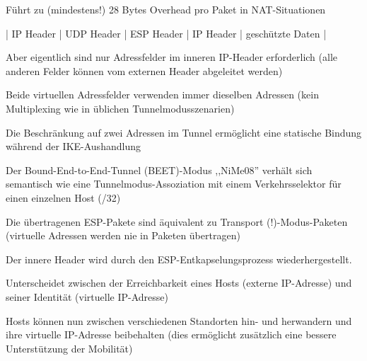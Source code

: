 \documentclass[a4paper]{article}
\begin{document}
\begin{multicols}{3}
\begin{itemize*}
\begin{itemize*}
\begin{itemize*}
                        \item Führt zu (mindestens!) 28 Bytes Overhead pro Paket in NAT-Situationen
                        \item | IP Header | UDP Header | ESP Header | IP Header | geschützte Daten |
                  \end{itemize*}
                  \item Aber eigentlich sind nur Adressfelder im inneren IP-Header
                  erforderlich (alle anderen Felder können vom externen Header
                  abgeleitet werden)
                  \item Beide virtuellen Adressfelder verwenden immer dieselben Adressen (kein
                  Multiplexing wie in üblichen Tunnelmodusszenarien)
                  \item Die Beschränkung auf zwei Adressen im Tunnel ermöglicht eine statische
                  Bindung während der IKE-Aushandlung
                  \item Der Bound-End-to-End-Tunnel (BEET)-Modus ,,NiMe08'' verhält sich
                  semantisch wie eine Tunnelmodus-Assoziation mit einem Verkehrsselektor
                  für einen einzelnen Host (/32)
                  \item Die übertragenen ESP-Pakete sind äquivalent zu Transport
                  (!)-Modus-Paketen (virtuelle Adressen werden nie in Paketen
                  übertragen)
                  \item Der innere Header wird durch den ESP-Entkapselungsprozess
                  wiederhergestellt.
                  \item Unterscheidet zwischen der Erreichbarkeit eines Hosts (externe
                  IP-Adresse) und seiner Identität (virtuelle IP-Adresse)
                  \item Hosts können nun zwischen verschiedenen Standorten hin- und herwandern
                  und ihre virtuelle IP-Adresse beibehalten (dies ermöglicht zusätzlich
                  eine bessere Unterstützung der Mobilität)
            \end{itemize*}


\end{itemize*}
\end{multicols}
\end{document}
